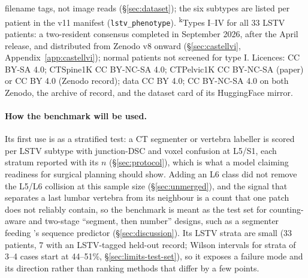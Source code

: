 \begin{table}[h]
filename tags, not image reads (\S\ref{sec:dataset}); the six subtypes are listed per
patient in the v11 manifest (\texttt{lstv\_phenotype}).
\textsuperscript{k}Types I--IV for all 33 LSTV patients: a two-resident consensus completed
in September 2026, after the April release, and distributed from Zenodo v8 onward
(\S\ref{sec:castellvi}, Appendix~\ref{app:castellvi}); normal patients not screened for
type I.
Licences: \VerSe{} CC BY-SA 4.0; CTSpine1K CC BY-NC-SA 4.0; CTPelvic1K CC BY-NC-SA (paper)
or CC BY 4.0 (Zenodo record); \TS{} data CC BY 4.0; \dataset{} CC BY-NC-SA 4.0 on both Zenodo,
the archive of record, and the dataset card of its HuggingFace mirror.
\end{table}

\paragraph{How the benchmark will be used.}
Its first use is as a stratified test: a CT segmenter or vertebra labeller is scored per
LSTV subtype with junction-DSC and voxel confusion at L5/S1,
each stratum reported with its $n$ (\S\ref{sec:protocol}), which is what a model claiming
readiness for surgical planning should show. Adding an L6 class did not remove the L5/L6
collision at this sample size (\S\ref{sec:unmerged}), and the signal that separates a last
lumbar vertebra from its neighbour is a count that one patch does not reliably contain, so
the benchmark is meant as the test set for counting-aware and two-stage ``segment, then
number'' designs, such as a segmenter feeding \VERIDAH{}'s sequence predictor
(\S\ref{sec:discussion}). Its LSTV strata are small (33 patients, 7 with an LSTV-tagged
held-out record; Wilson intervals for strata of 3--4 cases start at 44--51\%,
\S\ref{sec:limits-test-set}), so it exposes a failure mode and its direction rather than
ranking methods that differ by a few points.
